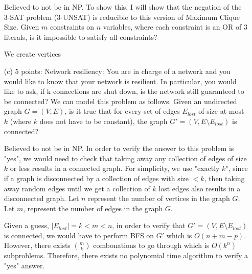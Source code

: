 \documentclass[12pt]{article}
\newcounter{subproblem}
\begin{document}
\begin{enumerate}
  Believed to not be in NP. To show this, I will show that the negation of the 3-SAT problem (3-UNSAT) is reducible to this version of Maximum Clique Size. Given $m$ constraints on $n$ variables, where each constraint is an OR of $3$ literals, is it impossible to satisfy all constraints? 

  We create vertices 

\item[(c)] 5 points: Network resiliency: You are in charge of a network and you would like to know that your network is resilient. In particular, you would like to ask, if k connections are shut down, is the network still guaranteed to be connected?
We can model this problem as follows. Given an undirected graph $G = (V,E)$, is it true that for every set of edges $E_{lost}$ of size at most $k$ (where $k$ does not have to be constant), the graph $G' = (V,E \setminus E_{lost})$ is connected?

  Believed to not be in NP. In order to verify the answer to this problem is "yes", we would need to check that taking away any collection of edges of size $k$ or less results in a connected graph. For simplicity, we use "exactly $k$", since if a graph is disconnected by a collection of edges with size $< k$, then taking away random edges until we get a collection of $k$ lost edges also results in a disconnected graph. Let $n$ represent the number of vertices in the graph $G$; Let $m$, represent the number of edges in the graph $G$.

  Given a guess, $|E_{lost}| = k < m < n$, in order to verify that $G' = (V,E \setminus E_{lost})$ is connected, we would have to perform BFS on $G'$ which is $O(n + m - p)$. However, there exists $\binom{m}{k}$ combonations to go through which is $O(k^n)$ subproblems. Therefore, there exists no polynomial time algorithm to verify a "yes" answer. 
  
  




\end{enumerate}
\end{document}
